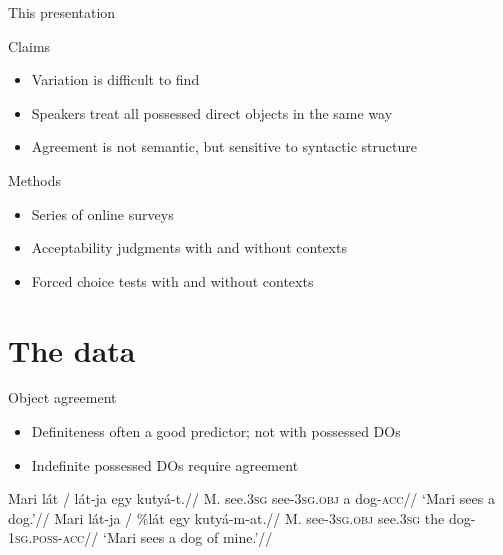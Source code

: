 \documentclass[12pt]{beamer}
\begin{document}
\begin{frame}{This presentation}

    \begin{block}{Claims}

        \begin{itemize}

        \item Variation is difficult to find

        \item Speakers treat all possessed direct objects in the same way

        \item Agreement is not semantic, but sensitive to \alert{syntactic structure}

        \end{itemize}

    \end{block}

    \begin{block}{Methods}

        \begin{itemize}

            \item Series of online surveys

            \item Acceptability judgments with and without contexts

            \item Forced choice tests with and without contexts

        \end{itemize}
    \end{block}

\end{frame}

\section{The data}

\begin{frame}{Object agreement}

    \begin{itemize}

        \item Definiteness often a good predictor; not with possessed DOs

        \item Indefinite possessed DOs require agreement

    \end{itemize}

\pex
    \a
        \begingl
            \gla    Mari {lát /} \ljudge*lát-ja egy kutyá-t.//
            \glb    M.   see.\textsc{3sg} see-\textsc{3sg.obj} a   dog-\textsc{acc}//
            \glft   ‘Mari sees a dog.’//
        \endgl
    \pause
    \a
        \begingl
            \gla    Mari {lát-ja /} \ljudge\%lát egy kutyá-m-at.//
            \glb    M.   see-\textsc{\alert{3sg.obj}} see.\textsc{3sg} the dog-\textsc{\alert{1sg.poss}-acc}//
            \glft   ‘Mari sees a dog of mine.’//
        \endgl
\xe

\end{frame}
\end{document}
